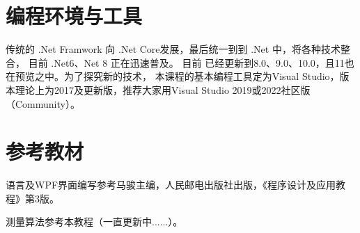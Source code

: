 \section*{编程环境与工具}

传统的 .Net Framwork 向 .Net Core发展，最后统一到到 .Net 中，将各种技术整合， 目前 .Net6、Net 8 正在迅速普及。 目前 \cs 已经更新到8.0、9.0、10.0，且11也在预览之中。为了探究新的技术，
本课程的基本编程工具定为Visual Studio，版本理论上为2017及更新版，推荐大家用Visual Studio 2019或2022社区版（Community）。

\section*{参考教材}

\cs 语言及WPF界面编写参考马骏主编，人民邮电出版社出版，《\cs 程序设计及应用教程》第3版。

测量算法参考本教程（一直更新中......）。
